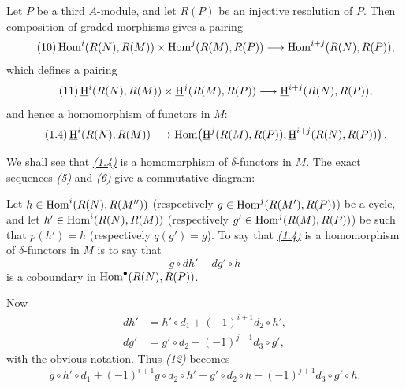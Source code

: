 Let $P$ be a third $A$-module, and let $R(P)$ be an injective
resolution of $P$. Then composition of graded morphisms gives a pairing
\begin{equation}\tag{10}\label{eq:V.10}
  \operatorname{Hom}^i(R(N),R(M))\times\operatorname{Hom}^j(R(M),R(P))
    \longrightarrow \operatorname{Hom}^{i+j}(R(N),R(P)),
\end{equation}
which defines a pairing
\begin{equation}\tag{11}\label{eq:V.11}
  \mathop{\underline{\mathrm H}}\nolimits^i(R(N),R(M))\times\mathop{\underline{\mathrm H}}\nolimits^j(R(M),R(P))
    \longrightarrow \mathop{\underline{\mathrm H}}\nolimits^{i+j}(R(N),R(P)),
\end{equation}
and hence a homomorphism of functors in $M$:
\begin{equation*}\tag{1.4}\label{eq:V.1.4}
  \mathop{\underline{\mathrm H}}\nolimits^i(R(N),R(M))\longrightarrow
  \operatorname{Hom}\!\left(\mathop{\underline{\mathrm H}}\nolimits^j(R(M),R(P)),\mathop{\underline{\mathrm H}}\nolimits^{i+j}(R(N),R(P))\right).
\end{equation*}

We shall see that \emph{\hyperref[eq:V.1.4]{(1.4)}} is a homomorphism of $\delta$-functors in
$M$. The exact sequences \emph{\hyperref[eq:V.5]{(5)}} and \emph{\hyperref[eq:V.6]{(6)}} give a commutative
diagram:
\begin{center}
\end{center}
Let $h\in\operatorname{Hom}^i(R(N),R(M''))$ (respectively
$g\in\operatorname{Hom}^j(R(M'),R(P))$) be a cycle, and let
$h'\in\operatorname{Hom}^i(R(N),R(M))$ (respectively
$g'\in\operatorname{Hom}^j(R(M),R(P))$) be such that $p(h')=h$ (respectively
$q(g')=g$). To say that \emph{\hyperref[eq:V.1.4]{(1.4)}} is a homomorphism of $\delta$-functors
in $M$ is to say that
\begin{equation}\tag{12}\label{eq:V.12}
  g\circ dh'-dg'\circ h
\end{equation}
is a coboundary in $\operatorname{Hom}^{\bullet}(R(N),R(P))$.

Now
\begin{align*}
  dh'&=h'\circ d_1+(-1)^{i+1}d_2\circ h',\\
  dg'&=g'\circ d_2+(-1)^{j+1}d_3\circ g',
\end{align*}
with the obvious notation. Thus \emph{\hyperref[eq:V.12]{(12)}} becomes
\[
  g\circ h'\circ d_1+(-1)^{i+1}g\circ d_2\circ h'
  -g'\circ d_2\circ h-(-1)^{j+1}d_3\circ g'\circ h.
\]

